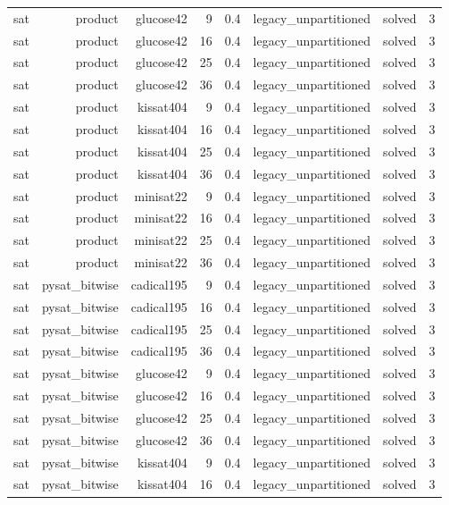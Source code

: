 \begin{tabular}{lrrrrrrr}
sat & product & glucose42 & 9 & 0.4 & legacy\_unpartitioned & solved & 3 \\
sat & product & glucose42 & 16 & 0.4 & legacy\_unpartitioned & solved & 3 \\
sat & product & glucose42 & 25 & 0.4 & legacy\_unpartitioned & solved & 3 \\
sat & product & glucose42 & 36 & 0.4 & legacy\_unpartitioned & solved & 3 \\
sat & product & kissat404 & 9 & 0.4 & legacy\_unpartitioned & solved & 3 \\
sat & product & kissat404 & 16 & 0.4 & legacy\_unpartitioned & solved & 3 \\
sat & product & kissat404 & 25 & 0.4 & legacy\_unpartitioned & solved & 3 \\
sat & product & kissat404 & 36 & 0.4 & legacy\_unpartitioned & solved & 3 \\
sat & product & minisat22 & 9 & 0.4 & legacy\_unpartitioned & solved & 3 \\
sat & product & minisat22 & 16 & 0.4 & legacy\_unpartitioned & solved & 3 \\
sat & product & minisat22 & 25 & 0.4 & legacy\_unpartitioned & solved & 3 \\
sat & product & minisat22 & 36 & 0.4 & legacy\_unpartitioned & solved & 3 \\
sat & pysat\_bitwise & cadical195 & 9 & 0.4 & legacy\_unpartitioned & solved & 3 \\
sat & pysat\_bitwise & cadical195 & 16 & 0.4 & legacy\_unpartitioned & solved & 3 \\
sat & pysat\_bitwise & cadical195 & 25 & 0.4 & legacy\_unpartitioned & solved & 3 \\
sat & pysat\_bitwise & cadical195 & 36 & 0.4 & legacy\_unpartitioned & solved & 3 \\
sat & pysat\_bitwise & glucose42 & 9 & 0.4 & legacy\_unpartitioned & solved & 3 \\
sat & pysat\_bitwise & glucose42 & 16 & 0.4 & legacy\_unpartitioned & solved & 3 \\
sat & pysat\_bitwise & glucose42 & 25 & 0.4 & legacy\_unpartitioned & solved & 3 \\
sat & pysat\_bitwise & glucose42 & 36 & 0.4 & legacy\_unpartitioned & solved & 3 \\
sat & pysat\_bitwise & kissat404 & 9 & 0.4 & legacy\_unpartitioned & solved & 3 \\
sat & pysat\_bitwise & kissat404 & 16 & 0.4 & legacy\_unpartitioned & solved & 3 \\

\end{tabular}
